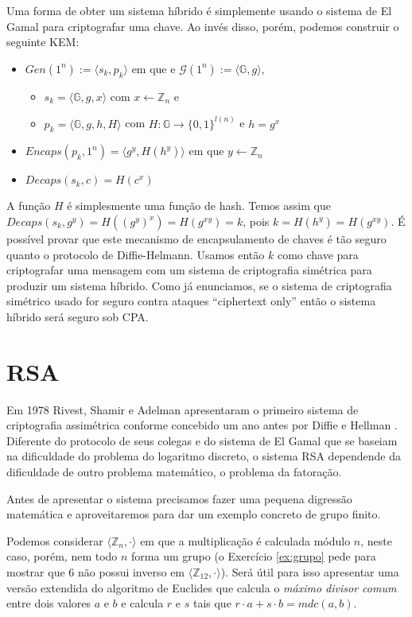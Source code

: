 Uma forma de obter um sistema híbrido é simplemente usando o sistema de El Gamal para criptografar uma chave.
Ao invés disso, porém, podemos construir o seguinte KEM:

\begin{itemize}
\item $Gen(1^n) := \langle s_k, p_k \rangle$ em que e $\mathcal{G}(1^n) := \langle \mathbb{G}, g \rangle$, 
\begin{itemize}
\item $s_k = \langle \mathbb{G}, g, x \rangle$ com $x \leftarrow \mathbb{Z}_n$ e
\item $p_k = \langle \mathbb{G}, g, h, H \rangle$ com $H: \mathbb{G} \to \{0,1\}^{l(n)}$ e $h = g^x$
\end{itemize}
\item $Encaps(p_k, 1^n) = \langle g^y, H(h^y)\rangle$ em que $y \leftarrow \mathbb{Z}_n$
\item $Decaps(s_k, c) = H(c^x)$
\end{itemize}

A função $H$ é simplesmente uma função de hash.
Temos assim que $Decaps(s_k, g^y) = H((g^y)^x) = H(g^{xy}) = k$, pois $k = H(h^y) = H(g^{xy})$.
É possível provar que este mecanismo de encapsulamento de chaves é tão seguro quanto o protocolo de Diffie-Helmann.
Usamos então $k$ como chave para criptografar uma mensagem com um sistema de criptografia simétrica para produzir um sistema híbrido.
Como já enunciamos, se o sistema de criptografia simétrico usado for seguro contra ataques ``ciphertext only'' então o sistema híbrido será seguro sob CPA.

\section{RSA}
\label{sec:rsa}

Em 1978 Rivest, Shamir e Adelman apresentaram o primeiro sistema de criptografia assimétrica conforme concebido um ano antes por Diffie e Hellman \cite{Rivest78}.
Diferente do protocolo de seus colegas e do sistema de El Gamal que se baseiam na dificuldade do problema do logaritmo discreto, o sistema RSA dependende da dificuldade de outro problema matemático, o problema da fatoração.

Antes de apresentar o sistema precisamos fazer uma pequena digressão matemática e aproveitaremos para dar um exemplo concreto de grupo finito.

Podemos considerar $\langle \mathbb{Z}_n, \cdot \rangle$ em que a multiplicação é calculada módulo $n$, neste caso, porém, nem todo $n$ forma um grupo (o Exercício \ref{ex:grupo} pede para mostrar que $6$ não possui inverso em $\langle \mathbb{Z}_{12}, \cdot \rangle$).
Será útil para isso apresentar uma versão extendida do algoritmo de Euclides que calcula o {\em máximo divisor comum} entre dois valores $a$ e $b$ e calcula $r$ e $s$ tais que $r \cdot a + s \cdot b = mdc(a,b)$.

